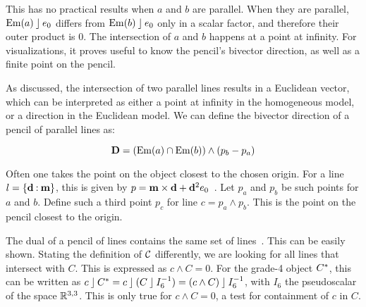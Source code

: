 This has no practical results when $a$ and $b$ are parallel.  When they are parallel, $\operatorname{Em}(a) \mathbin{\rfloor} e_0$ differs from $\operatorname{Em}(b) \mathbin{\rfloor} e_0$ only in a scalar factor, and therefore their outer product is $0$.  The intersection of $a$ and $b$ happens at a point at infinity.  For visualizations, it proves useful to know the pencil's bivector direction, as well as a finite point on the pencil.  

As discussed, the intersection of two parallel lines results in a Euclidean vector, which can be interpreted as either a point at infinity in the homogeneous model, or a direction in the Euclidean model.  We can define the bivector direction of a pencil of parallel lines as:

\begin{equation*}
  \mathbf{D} = \left(\operatorname{Em}(a) \cap \operatorname{Em}(b)\right) \wedge \left(p_b - p_a\right)
\end{equation*}

Often one takes the point on the object closest to the chosen origin.  For a line $l = \{\mathbf{d} \mathbin{:} \mathbf{m}\}$, this is given by $p = \mathbf{m} \times \mathbf{d} + \mathbf{d}^2 e_0$~\cite{Shoemake}.  Let $p_a$ and $p_b$ be such points for $a$ and $b$.  Define such a third point $p_c$ for line $c = p_a \wedge p_b$.  This is the point on the pencil closest to the origin.  


The dual of a pencil of lines contains the same set of lines~\cite[Section 3.2.1]{Pottmann}.  This can be easily shown.  Stating the definition of $\mathcal{C}$ differently, we are looking for all lines that intersect with $C$.  This is expressed as $c \wedge C = 0$.  For the grade-4 object $C^\ast$, this can be written as $c \mathbin{\rfloor} C^\ast = c \mathbin{\rfloor} (C \mathbin{\rfloor} I_6^{-1}) = (c \wedge C) \mathbin{\rfloor} I_6^{-1}$, with $I_6$ the pseudoscalar of the space $\mathbb{R}^{3,3}$.  This is only true for $c \wedge C = 0$, a test for containment of $c$ in $C$.

